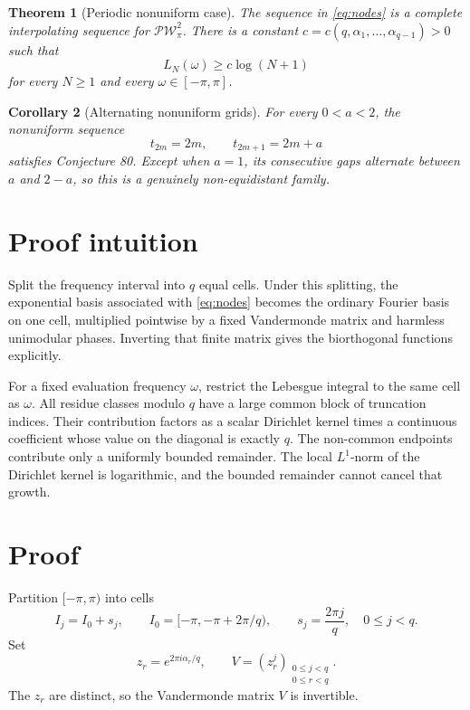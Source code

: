 \documentclass[11pt]{article}
\newtheorem{theorem}{Theorem}
\newtheorem{corollary}[theorem]{Corollary}
\newcommand{\PW}{\mathcal{PW}}
\begin{document}
\begin{theorem}[Periodic nonuniform case]\label{thm:main}
The sequence in \eqref{eq:nodes} is a complete interpolating sequence for
\(\PW_\pi^2\).  There is a constant
\(c=c(q,\alpha_1,\ldots,\alpha_{q-1})>0\) such that
\[
 L_N(\omega)\geq c\log(N+1)
\]
for every \(N\geq1\) and every \(\omega\in[-\pi,\pi]\).
\end{theorem}

\begin{corollary}[Alternating nonuniform grids]\label{cor:q2}
For every \(0<a<2\), the nonuniform sequence
\[
 t_{2m}=2m,\qquad t_{2m+1}=2m+a
\]
satisfies Conjecture 80.  Except when \(a=1\), its consecutive gaps alternate
between \(a\) and \(2-a\), so this is a genuinely non-equidistant family.
\end{corollary}

\section*{Proof intuition}

Split the frequency interval into \(q\) equal cells.  Under this splitting,
the exponential basis associated with \eqref{eq:nodes} becomes the ordinary
Fourier basis on one cell, multiplied pointwise by a fixed Vandermonde
matrix and harmless unimodular phases.  Inverting that finite matrix gives
the biorthogonal functions explicitly.

For a fixed evaluation frequency \(\omega\), restrict the Lebesgue integral
to the same cell as \(\omega\).  All residue classes modulo \(q\) have a
large common block of truncation indices.  Their contribution factors as
a scalar Dirichlet kernel times a continuous coefficient whose value on
the diagonal is exactly \(q\).  The non-common endpoints contribute only
a uniformly bounded remainder.  The local \(L^1\)-norm of the Dirichlet
kernel is logarithmic, and the bounded remainder cannot cancel that growth.

\section*{Proof}

Partition \([-\pi,\pi)\) into cells
\[
 I_j=I_0+s_j,\qquad
 I_0=[-\pi,-\pi+2\pi/q),\qquad s_j=\frac{2\pi j}{q},
 \quad 0\leq j<q.
\]
Set
\[
 z_r=e^{2\pi i\alpha_r/q},\qquad
 V=(z_r^j)_{\substack{0\leq j<q\\0\leq r<q}}.
\]
The \(z_r\) are distinct, so the Vandermonde matrix \(V\) is invertible.
\end{document}
